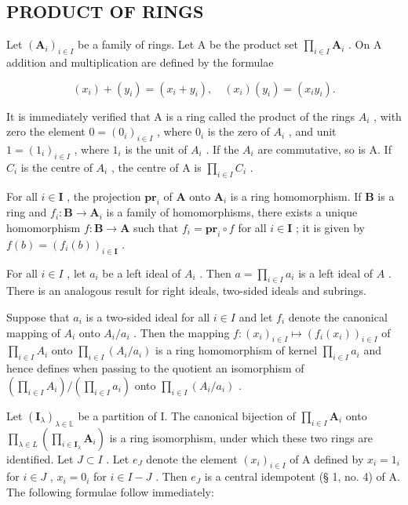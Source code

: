 \subsection{PRODUCT OF RINGS}

Let \((\mathbf{A}_i)_{i\in I}\) be a family of rings. Let A be the product set \(\prod_{i\in I} \mathbf{A}_i\) . On A addition and multiplication are defined by the formulae

\[
(x _ {i}) + (y _ {i}) = (x _ {i} + y _ {i}), \quad (x _ {i}) (y _ {i}) = (x _ {i} y _ {i}).\tag{22}
\]

It is immediately verified that A is a ring called the product of the rings \(A_{i}\) , with zero the element \(0 = (0_{i})_{i \in I}\) , where \(0_{i}\) is the zero of \(A_{i}\) , and unit \(1 = (1_{i})_{i \in I}\) , where \(1_{i}\) is the unit of \(A_{i}\) . If the \(A_{i}\) are commutative, so is A. If \(C_{i}\) is the centre of \(A_{i}\) , the centre of A is \(\prod_{i \in I} C_{i}\) .

For all \(i \in \mathbf{I}\) , the projection \(\mathbf{pr}_i\) of \(\mathbf{A}\) onto \(\mathbf{A}_i\) is a ring homomorphism. If \(\mathbf{B}\) is a ring and \(f_i \colon \mathbf{B} \to \mathbf{A}_i\) is a family of homomorphisms, there exists a unique homomorphism \(f \colon \mathbf{B} \to \mathbf{A}\) such that \(f_i = \mathbf{pr}_i \circ f\) for all \(i \in \mathbf{I}\) ; it is given by \(f(b) = (f_i(b))_{i \in \mathbf{I}}\) .

For all \(i \in I\) , let \(a_i\) be a left ideal of \(A_i\) . Then \(a = \prod_{i \in I} a_i\) is a left ideal of \(A\) . There is an analogous result for right ideals, two-sided ideals and subrings.

Suppose that \(a_{i}\) is a two-sided ideal for all \(i \in I\) and let \(f_{i}\) denote the canonical mapping of \(A_{i}\) onto \(A_{i}/a_{i}\) . Then the mapping \(f: (x_{i})_{i \in I} \mapsto (f_{i}(x_{i}))_{i \in I}\) of \(\prod_{i \in I} A_{i}\) onto \(\prod_{i \in I} (A_{i}/a_{i})\) is a ring homomorphism of kernel \(\prod_{i \in I} a_{i}\) and hence defines when passing to the quotient an isomorphism of \(\left( \prod_{i \in I} A_{i} \right) / \left( \prod_{i \in I} a_{i} \right)\) onto \(\prod_{i \in I} (A_{i}/a_{i})\) .

Let \((\mathbf{I}_{\lambda})_{\lambda \in \mathbb{L}}\) be a partition of I. The canonical bijection of \(\prod_{i\in I}\mathbf{A}_i\) onto \(\prod_{\lambda \in L}\left(\prod_{i\in \mathbf{I}_{\lambda}}\mathbf{A}_i\right)\) is a ring isomorphism, under which these two rings are identified. Let \(J\subset I\) . Let \(e_J\) denote the element \((x_i)_{i\in I}\) of A defined by \(x_{i} = 1_{i}\) for \(i\in J\) , \(x_{i} = 0_{i}\) for \(i\in I - J\) . Then \(e_J\) is a central idempotent (§ 1, no. 4) of A. The following formulae follow immediately:

